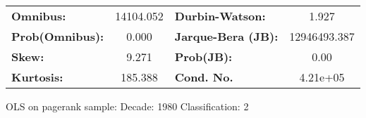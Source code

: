 \begin{center}
\begin{tabular}{lccccc}
\bottomrule
\end{tabular}
\begin{tabular}{lclc}
\textbf{Omnibus:}       & 14104.052 & \textbf{  Durbin-Watson:     } &      1.927    \\
\textbf{Prob(Omnibus):} &    0.000  & \textbf{  Jarque-Bera (JB):  } & 12946493.387  \\
\textbf{Skew:}          &    9.271  & \textbf{  Prob(JB):          } &       0.00    \\
\textbf{Kurtosis:}      &  185.388  & \textbf{  Cond. No.          } &   4.21e+05    \\
\bottomrule
\end{tabular}
\end{center}
\break
OLS on pagerank sample: Decade: 1980 Classification: 2
